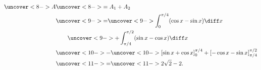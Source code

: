 \begin{frame}
\begin{example}
\begin{columns}
\abovedisplayskip=0pt
\belowdisplayskip=0pt
\abovedisplayshortskip=0pt
\belowdisplayshortskip=0pt
\begin{align*}
\uncover<8->{A} & \uncover<8->{ = A_1 + A_2} \\%
 & \uncover<9->{=}  \uncover<9->{\int_0^{\pi /4} (\cos x - \sin x )\diff x} \\
&  \qquad \uncover<9->{+ \int_{\pi /4}^{\pi /2} (\sin x - \cos x)\diff x} \\
 & \uncover<10->{=}  \uncover<10->{\left[ \sin x + \cos x \right]_0^{\pi / 4} + \left[ -\cos x - \sin x\right]_{\pi /4}^{\pi /2}}  \\
 & \uncover<11->{=}  \uncover<11->{2\sqrt{2} - 2.}%
\end{align*}
\end{columns}
\end{example}
\end{frame}
